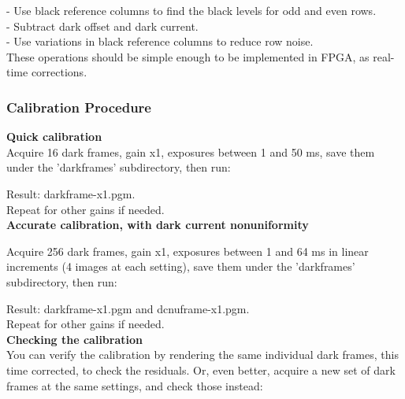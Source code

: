 - Use black reference columns to find the black levels for odd and even rows.\\
- Subtract dark offset and dark current.\\
- Use variations in black reference columns to reduce row noise.\\ 

These operations should be simple enough to be implemented in FPGA, as real-time corrections. 





\subsubsection{Calibration Procedure}

\textbf{Quick calibration}\\

Acquire 16 dark frames, gain x1, exposures between 1 and 50 ms, save them under the 'darkframes' subdirectory, then run: 


Result: darkframe-x1.pgm.\\

Repeat for other gains if needed.\\ 


\textbf{Accurate calibration, with dark current nonuniformity}

Acquire 256 dark frames, gain x1, exposures between 1 and 64 ms in linear increments (4 images at each setting), save them under the 'darkframes' subdirectory, then run: 


Result: darkframe-x1.pgm and dcnuframe-x1.pgm.\\

Repeat for other gains if needed. \\

\textbf{Checking the calibration}\\

You can verify the calibration by rendering the same individual dark frames, this time corrected, to check the residuals. Or, even better, acquire a new set of dark frames at the same settings, and check those instead: 


